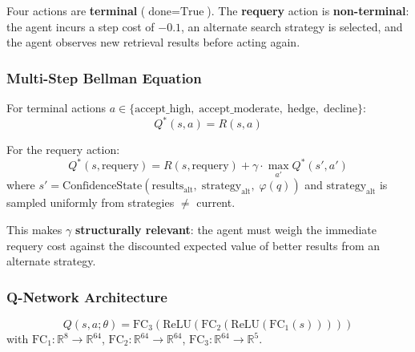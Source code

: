\documentclass[11pt,letterpaper]{article}
\begin{document}
Four actions are \textbf{terminal} ($\text{done} = \text{True}$). The \textbf{requery} action is \textbf{non-terminal}: the agent incurs a step cost of $-0.1$, an alternate search strategy is selected, and the agent observes new retrieval results before acting again.

\subsubsection{Multi-Step Bellman Equation}

For terminal actions $a \in \{\text{accept\_high},\; \text{accept\_moderate},\; \text{hedge},\; \text{decline}\}$:
\begin{equation}
  Q^*(s, a) = R(s, a)
\end{equation}

For the requery action:
\begin{equation}
  Q^*(s, \text{requery}) = R(s, \text{requery}) + \gamma \cdot \max_{a'} Q^*(s', a')
  \label{eq:bellman-requery}
\end{equation}
where $s' = \text{ConfidenceState}(\text{results}_{\text{alt}},\; \text{strategy}_{\text{alt}},\; \varphi(q))$ and $\text{strategy}_{\text{alt}}$ is sampled uniformly from strategies $\neq$ current.

This makes $\gamma$ \textbf{structurally relevant}: the agent must weigh the immediate requery cost against the discounted expected value of better results from an alternate strategy.

\subsubsection{Q-Network Architecture}

\begin{equation}
  Q(s, a; \theta) = \text{FC}_3(\text{ReLU}(\text{FC}_2(\text{ReLU}(\text{FC}_1(s)))))
\end{equation}
with $\text{FC}_1: \mathbb{R}^8 \to \mathbb{R}^{64}$, $\text{FC}_2: \mathbb{R}^{64} \to \mathbb{R}^{64}$, $\text{FC}_3: \mathbb{R}^{64} \to \mathbb{R}^5$.
\end{document}
